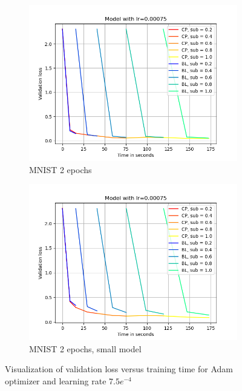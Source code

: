 \begin{figure}[h]
\begin{subfigure}[b]{0.24\textwidth}
        \centering
        \includegraphics[width=\textwidth]{figures/22_07/2ep/loss_time_0.00075.png}
        \caption{MNIST 2 epochs}
        \label{fig:3c}
    \end{subfigure}
    \begin{subfigure}[b]{0.24\textwidth}
        \centering
        \includegraphics[width=\textwidth]{figures/22_07/2ep_smaller/loss_time_0.00075.png}
        \caption{MNIST 2 epochs, small model}
        \label{fig:3d}
    \end{subfigure}
    \caption{Visualization of validation loss versus training time for Adam optimizer and learning rate $7.5e^{-4}$}
    \label{fig:three graphs}
\end{figure}

